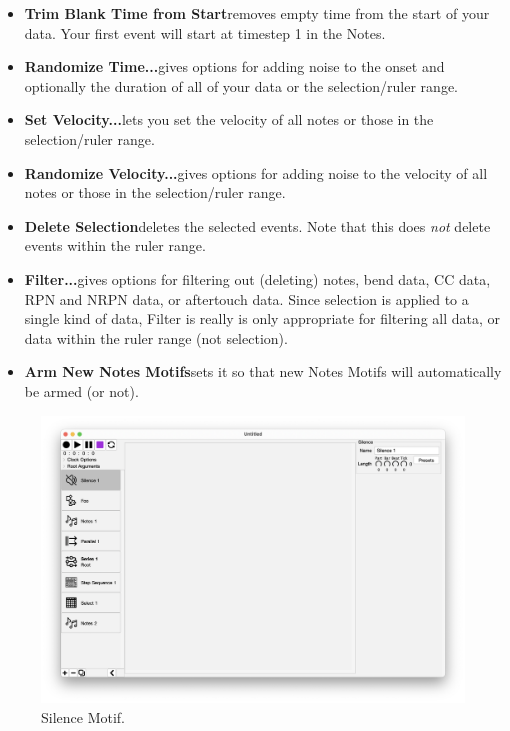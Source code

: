 \documentclass[twoside,10pt]{article}
\begin{document}
\begin{itemize}
\item{\bf Trim Blank Time from Start}\quad removes empty time from the start of your data.  Your first event will start at timestep 1 in the Notes.

\item{\bf Randomize Time...}\quad gives options for adding noise to the onset and optionally the duration of all of your data or the selection/ruler range.

\item{\bf Set Velocity...}\quad lets you set the velocity of all notes or those in the selection/ruler range.

\item{\bf Randomize Velocity...}\quad gives options for adding noise to the velocity of all notes or those in the selection/ruler range.

\item{\bf Delete Selection}\quad deletes the selected events.  Note that this does {\it not} delete events within the ruler range.

\item{\bf Filter...}\quad gives options for filtering out (deleting) notes, bend data, CC data, RPN and NRPN data, or aftertouch data.  Since selection is applied to a single kind of data, Filter is really is only appropriate for filtering all data, or data within the ruler range (not selection).

\item{\bf Arm New Notes Motifs}\quad sets it so that new Notes Motifs will automatically be armed (or not).

\end{itemize}


\clearpage

\begin{figure}[t]
\centering
\includegraphics[width=6.5in]{Silence}
\vspace{-2em}
\caption{Silence Motif.}
\label{silence}
\end{figure}
\end{document}

